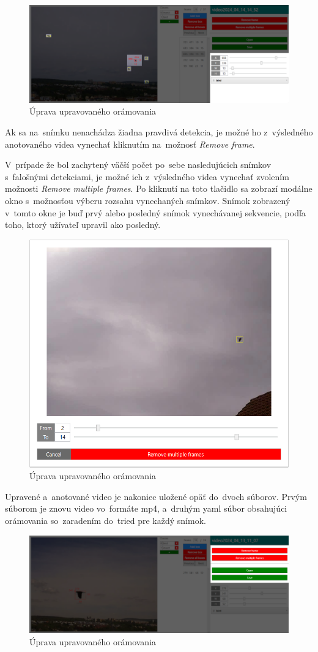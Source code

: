         \begin{figure}[H]
            \centering
            \includegraphics[width=\textwidth]{obrazky/video_annotator/bbox_edit.png}
            \caption{Úprava upravovaného orámovania}
        \end{figure}

        Ak sa na~snímku nenachádza žiadna pravdivá detekcia, je možné ho z~výsledného anotovaného videa vynechať kliknutím na~možnosť \emph{Remove frame}.

        V~prípade že bol zachytený väčší počet po~sebe nasledujúcich snímkov s~falošnými detekciami, je možné ich z~výsledného videa vynechať zvolením možnosti \emph{Remove multiple frames}. Po kliknutí na toto tlačidlo sa zobrazí modálne okno s~možnosťou výberu rozsahu vynechaných snímkov. Snímok zobrazený v~tomto okne je buď prvý alebo posledný snímok vynechávanej sekvencie, podľa toho, ktorý užívateľ upravil ako posledný.

        \begin{figure}[H]
            \centering
            \includegraphics[width=.65\textwidth]{obrazky/video_annotator/remove_multiple_frames.png}
            \caption{Úprava upravovaného orámovania}
        \end{figure}

        Upravené a~anotované video je nakoniec uložené opäť do~dvoch súborov. Prvým súborom je znovu video vo~formáte mp4, a~druhým yaml súbor obsahujúci orámovania so~zaradením do~tried pre každý snímok.

        \begin{figure}[H]
            \centering
            \includegraphics[width=\textwidth]{obrazky/video_annotator/video_controls.png}
            \caption{Úprava upravovaného orámovania}
        \end{figure}